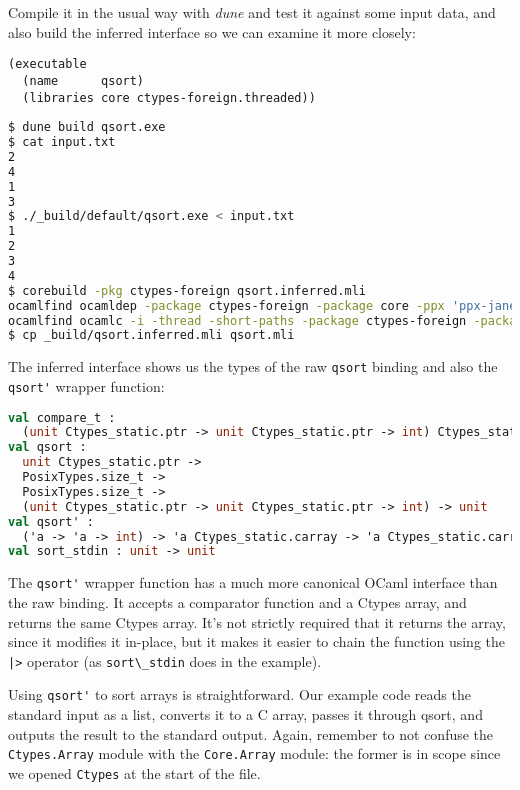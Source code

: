 Compile it in the usual way with \emph{dune} and test it against some
input data, and also build the inferred interface so we can examine it
more closely:

\begin{lstlisting}
(executable
  (name      qsort)
  (libraries core ctypes-foreign.threaded))
\end{lstlisting}

\begin{lstlisting}[language=bash]
$ dune build qsort.exe
$ cat input.txt
2
4
1
3
$ ./_build/default/qsort.exe < input.txt
1
2
3
4
$ corebuild -pkg ctypes-foreign qsort.inferred.mli
ocamlfind ocamldep -package ctypes-foreign -package core -ppx 'ppx-jane -as-ppx' -modules qsort.ml > qsort.ml.depends
ocamlfind ocamlc -i -thread -short-paths -package ctypes-foreign -package core -ppx 'ppx-jane -as-ppx' qsort.ml > qsort.inferred.mli
$ cp _build/qsort.inferred.mli qsort.mli
\end{lstlisting}

The inferred interface shows us the types of the raw
\passthrough{\lstinline!qsort!} binding and also the
\passthrough{\lstinline!qsort'!} wrapper function:

\begin{lstlisting}[language=Caml]
val compare_t :
  (unit Ctypes_static.ptr -> unit Ctypes_static.ptr -> int) Ctypes_static.fn
val qsort :
  unit Ctypes_static.ptr ->
  PosixTypes.size_t ->
  PosixTypes.size_t ->
  (unit Ctypes_static.ptr -> unit Ctypes_static.ptr -> int) -> unit
val qsort' :
  ('a -> 'a -> int) -> 'a Ctypes_static.carray -> 'a Ctypes_static.carray
val sort_stdin : unit -> unit
\end{lstlisting}

The \passthrough{\lstinline!qsort'!} wrapper function has a much more
canonical OCaml interface than the raw binding. It accepts a comparator
function and a Ctypes array, and returns the same Ctypes array. It's not
strictly required that it returns the array, since it modifies it
in-place, but it makes it easier to chain the function using the
\passthrough{\lstinline!|>!} operator (as
\passthrough{\lstinline!sort\_stdin!} does in the example).

Using \passthrough{\lstinline!qsort'!} to sort arrays is
straightforward. Our example code reads the standard input as a list,
converts it to a C array, passes it through qsort, and outputs the
result to the standard output. Again, remember to not confuse the
\passthrough{\lstinline!Ctypes.Array!} module with the
\passthrough{\lstinline!Core.Array!} module: the former is in scope
since we opened \passthrough{\lstinline!Ctypes!} at the start of the
file.

